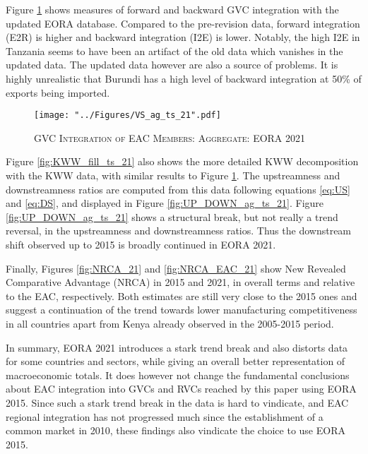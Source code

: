 \documentclass[a4paper]{article}
\begin{document}
Figure \ref{fig:VSag_ts_21} shows measures of forward and backward GVC integration with the updated EORA database. Compared to the pre-revision data, forward integration (E2R) is higher and backward integration (I2E) is lower. Notably, the high I2E in Tanzania seems to have been an artifact of the old data which vanishes in the updated data. The updated data however are also a source of problems. It is highly unrealistic that Burundi has a high level of backward integration at 50\% of exports being imported. 

\begin{figure}[h!] %
\centering
\caption{\label{fig:VSag_ts_21}\textsc{GVC Integration of EAC Members: Aggregate: EORA 2021}}
\texttt{[image: "../Figures/VS\_ag\_ts\_21".pdf]} %
\end{figure}
\FloatBarrier

Figure \ref{fig:KWW_fill_ts_21} also shows the more detailed KWW decomposition with the KWW data, with similar results to Figure \ref{fig:VSag_ts_21}. The upstreamness and downstreamness ratios are computed from this data following equations \ref{eq:US} and \ref{eq:DS}, and displayed in Figure \ref{fig:UP_DOWN_ag_ts_21}. Figure \ref{fig:UP_DOWN_ag_ts_21} shows a structural break, but not really a trend reversal, in the upstreamness and downstreamness ratios. Thus the downstream shift observed up to 2015 is broadly continued in EORA 2021. \newline

Finally, Figures \ref{fig:NRCA_21} and \ref{fig:NRCA_EAC_21} show New Revealed Comparative Advantage (NRCA) in 2015 and 2021, in overall terms and relative to the EAC, respectively. Both estimates are still very close to the 2015 ones and suggest a continuation of the trend towards lower manufacturing competitiveness in all countries apart from Kenya already observed in the 2005-2015 period. \newline

In summary, EORA 2021 introduces a stark trend break and also distorts data for some countries and sectors, while giving an overall better representation of macroeconomic totals. It does however not change the fundamental conclusions about EAC integration into GVCs and RVCs reached by this paper using EORA 2015. Since such a stark trend break in the data is hard to vindicate, and EAC regional integration has not progressed much since the establishment of a common market in 2010, these findings also vindicate the choice to use EORA 2015.  
\end{document}
